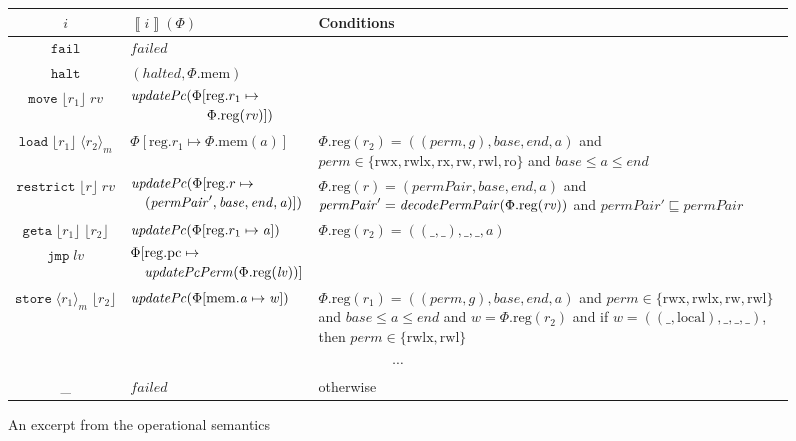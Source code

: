 \documentclass[compsoc,conference,letterpaper,fleqn]{IEEEtran}
\newcommand{\update}[2]{[#1 \mapsto #2]}
\newcommand{\sem}[1]{\left\llbracket #1 \right\rrbracket}
\newcommand{\var}[1]{\mathit{#1}}
\newcommand{\rv}{\var{rv}}
\newcommand{\lv}{\var{lv}}
\newcommand{\gl}{\var{g}}
\newcommand{\pcreg}{\mathrm{pc}}
\newcommand{\addr}{\var{a}}
\newcommand{\start}{\var{base}}
\newcommand{\addrend}{\var{end}}
\newcommand{\perm}{\var{perm}}
\newcommand{\permp}{\var{permPair}}
\newcommand{\stdcap}[1][(\perm,\gl)]{\left(#1,\start,\addrend,\addr \right)}
\newcommand{\plainproj}[1]{\mathrm{#1}}
\newcommand{\memheap}[1][\Phi]{#1.\plainproj{mem}}
\newcommand{\memreg}[1][\Phi]{#1.\plainproj{reg}}
\newcommand{\updateHeap}[3][\Phi]{#1\update{\plainproj{mem}.#2}{#3}}
\newcommand{\updateReg}[3][\Phi]{#1\update{\plainproj{reg}.#2}{#3}}
\newcommand{\failed}{\mathit{failed}}
\newcommand{\halted}{\mathit{halted}}
\newcommand{\plainfun}[2]{
  \ifthenelse{\equal{#2}{}}
  {\mathit{#1}}
  {\mathit{#1}(#2)}
}
\newcommand{\decodePermPair}{\plainfun{decodePermPair}}
\newcommand{\updatePcPerm}[1]{\plainfun{updatePcPerm}{#1}}
\newcommand{\stdUpdatePc}[1]{\plainfun{updatePc}{#1}}
\newcommand{\refreg}[1]{\lfloor #1 \rfloor}
\newcommand{\refheap}[1]{\langle #1 \rangle_m}
\newcommand{\zinstr}[1]{\mathtt{#1}}
\newcommand{\fail}{\zinstr{fail}}
\newcommand{\halt}{\zinstr{halt}}
\newcommand{\oneinstr}[2]{\zinstr{#1} \; #2}
\newcommand{\jmp}[1]{\oneinstr{jmp}{#1}}
\newcommand{\twoinstr}[3]{\zinstr{#1} \; #2 \; #3}
\newcommand{\restricttwo}[2]{\twoinstr{restrict}{#1}{#2}}
\newcommand{\geta}[2]{\twoinstr{geta}{#1}{#2}}
\newcommand{\move}[2]{\twoinstr{move}{#1}{#2}}
\newcommand{\store}[2]{\twoinstr{store}{#1}{#2}}
\newcommand{\load}[2]{\twoinstr{load}{#1}{#2}}
\newcommand{\plainperm}[1]{\mathrm{#1}}
\newcommand{\readonly}{\plainperm{ro}}
\newcommand{\readwrite}{\plainperm{rw}}
\newcommand{\exec}{\plainperm{rx}}
\newcommand{\rwx}{\plainperm{rwx}}
\newcommand{\readwritel}{\plainperm{rwl}}
\newcommand{\rwlx}{\plainperm{rwlx}}
\newcommand{\local}{\plainperm{local}}
\begin{document}
\begin{figure}
  \begin{tabular}{|c|p{3.8cm}|p{10.4cm}|}
    \hline
    $i$&$\sem{i}(\Phi)$&Conditions\\
    \hline
    $\fail$&$\failed$&\\
    \hline
    $\halt$&$(\halted,\memheap)$&\\
    \hline
    $\move{\refreg{r_1}}{\rv}$& $\begin{multlined}
      \stdUpdatePc{}(\updateReg{r_1}{\\
          \memreg(\rv)}) \end{multlined}$&\\
    \hline
    $\load{\refreg{r_1}}{\refheap{r_2}}$&$\updateReg{r_1}{\memheap(\addr)}$&$\memreg(r_2) = \stdcap$ and $\perm \in \{ \rwx, \rwlx, \exec, \readwrite, \readwritel, \readonly \}$  and  $\start \leq \addr \leq \addrend$\\
    \hline
    $\restricttwo{\refreg{r}}{\rv}$&$\begin{multlined}
                                       \stdUpdatePc{}(\updateReg{r}{\\(\permp',\start,\addrend,\addr)})
                                     \end{multlined}$  &
                                                        $\memreg(r) = \stdcap[\permp]$ and $\permp' = \decodePermPair{\memreg(\rv)}$
                                                      and $\permp'\sqsubseteq \permp$\\
    \hline
    $\geta{\refreg{r_1}}{\refreg{r_2}}$ & $\stdUpdatePc{\updateReg{r_1}{\addr}}$ &
                                                $\memreg(r_2) = ((\_,\_),\_,\_,\addr)$\\
    \hline
    $\jmp{\lv}$&$\begin{multlined}
                   \updateReg{\pcreg}{\\\updatePcPerm{\memreg(\lv)}}
                 \end{multlined}$&\\
    \hline
    $\store{\refheap{r_1}}{\refreg{r_2}}$&$\stdUpdatePc{\updateHeap{\addr}{\var{w}}}$&$\memreg(r_1) = \stdcap$ and $\perm \in \{ \rwx, \rwlx, \readwrite, \readwritel\}$  and  $\start \leq \addr \leq \addrend$ and $\var{w} = \memreg(r_2)$
                                                                                       and if  $\var{w} = ((\_,\local),\_,\_,\_)$, then  $\perm \in \{\rwlx,\readwritel \}$\\
    \hline
    \multicolumn{3}{|c|}{$\cdots$}\\
    \hline
    \_&$\failed$&otherwise\\
    \hline
  \end{tabular}
  \caption{An excerpt from the operational semantics}
  \label{fig:op-sem}
\end{figure}
\end{document}
